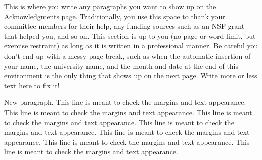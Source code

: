 \documentclass[12pt]{book}                  %
\begin{document}
 \thesistitlepage        %
 \thesiscopyrightpage    %
 \thesisdedicationpage   %

 \tableofcontents        %
 \listoffigures          %
 \listoftables           %
 \mylistoflistings      %


\begin{thesisacknowledgments}
This is where you write any paragraphs you want to show up on the Acknowledgments page.
Traditionally, you use this space to thank your committee members for their help, any
funding sources such as an NSF grant that helped you, and so on.  This section is up to
you (no page or word limit, but exercise restraint) as long as it is written in a
professional manner. Be careful you don't end up with a messy page break, such as when
the automatic insertion of your name, the university name, and the month and date at the
end of this environment is the only thing that shows up on the next page.  Write more or
less text here to fix it!

New paragraph. This line is meant to check the margins and text appearance. This line is
meant to check the margins and text appearance. This line is meant to check the margins
and text appearance. This line is meant to check the margins and text appearance. This
line is meant to check the margins and text appearance. This line is meant to check the
margins and text appearance. This line is meant to check the margins and text appearance.

\end{thesisacknowledgments}




\end{document}
